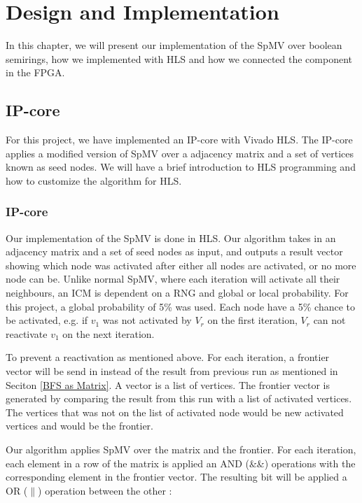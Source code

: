 \chapter{Design and Implementation} \label{methode}
In this chapter, we will present our implementation of the SpMV over boolean semirings, how we implemented with HLS and how we connected the component in the FPGA.

\section{IP-core}
For this project, we have implemented an IP-core with Vivado HLS. The IP-core applies a modified version of SpMV over a adjacency matrix and a set of vertices known as seed nodes. We will have a brief introduction to HLS programming and how to customize the algorithm for HLS.

\subsection{IP-core}
Our implementation of the SpMV is done in HLS. Our algorithm takes in an adjacency matrix and a set of seed nodes as input, and outputs a result vector showing which node was activated after either all nodes are activated, or no more node can be. Unlike normal SpMV, where each iteration will activate all their neighbours, an ICM is dependent on a RNG and global or local probability. For this project, a global probability of 5\% was used. Each node have a 5\% chance to be activated, e.g. if $v_1$ was not activated by $V_r$ on the first iteration, $V_r$ can not reactivate $v_1$ on the next iteration. 

To prevent a reactivation as mentioned above. For each iteration, a frontier vector will be send in instead of the result from previous run as mentioned in Seciton \ref{BFS as Matrix}. A vector is a list of vertices. The frontier vector is generated by comparing the result from this run with a list of activated vertices. The vertices that was not on the list of activated node would be new activated vertices and would be the frontier. 

Our algorithm applies SpMV over the matrix and the frontier. For each iteration, each element in a row of the matrix is applied an AND (\&\&) operations with the corresponding element in the frontier vector. The resulting bit will be applied a OR ($\|$) operation between the other :
\begin{algorithm}
\begin{algorithmic}[2]
\end{algorithmic}
\end{algorithm}



